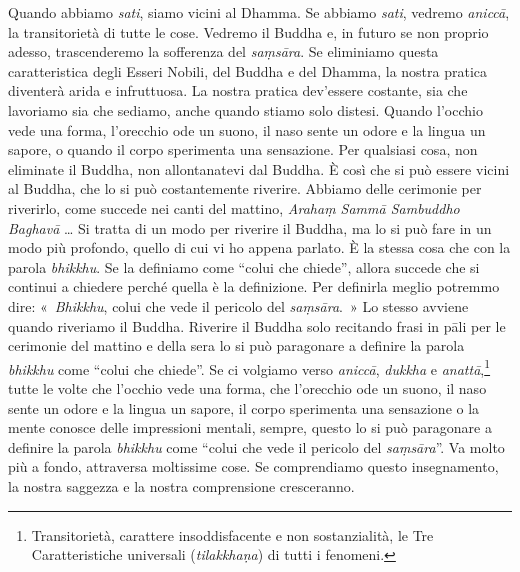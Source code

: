 Quando abbiamo \emph{sati}, siamo vicini al Dhamma. Se abbiamo
\emph{sati}, vedremo \emph{aniccā}, la transitorietà di tutte le cose.
Vedremo il Buddha e, in futuro se non proprio adesso, trascenderemo la
sofferenza del \emph{saṃsāra}. Se eliminiamo questa caratteristica degli
Esseri Nobili, del Buddha e del Dhamma, la nostra pratica diventerà
arida e infruttuosa. La nostra pratica dev'essere costante, sia che
lavoriamo sia che sediamo, anche quando stiamo solo distesi. Quando
l'occhio vede una forma, l'orecchio ode un suono, il naso sente un odore
e la lingua un sapore, o quando il corpo sperimenta una sensazione. Per
qualsiasi cosa, non eliminate il Buddha, non allontanatevi dal Buddha. È
così che si può essere vicini al Buddha, che lo si può costantemente
riverire. Abbiamo delle cerimonie per riverirlo, come succede nei canti
del mattino, \emph{Arahaṃ Sammā Sambuddho Baghavā} \ldots{} Si tratta di un
modo per riverire il Buddha, ma lo si può fare in un modo più profondo,
quello di cui vi ho appena parlato. È la stessa cosa che con la parola
\emph{bhikkhu}. Se la definiamo come ``colui che chiede'', allora
succede che si continui a chiedere perché quella è la definizione. Per
definirla meglio potremmo dire: «~\emph{Bhikkhu}, colui che vede il
pericolo del \emph{saṃsāra}.~» Lo stesso avviene quando riveriamo il
Buddha. Riverire il Buddha solo recitando frasi in pāli per le cerimonie
del mattino e della sera lo si può paragonare a definire la parola
\emph{bhikkhu} come ``colui che chiede''. Se ci volgiamo verso
\emph{aniccā}, \emph{dukkha} e \emph{anattā},\footnote{Transitorietà,
  carattere insoddisfacente e non sostanzialità, le Tre Caratteristiche
  universali (\emph{tilakkhaṇa}) di tutti i fenomeni.} tutte le volte
che l'occhio vede una forma, che l'orecchio ode un suono, il naso sente
un odore e la lingua un sapore, il corpo sperimenta una sensazione o la
mente conosce delle impressioni mentali, sempre, questo lo si può
paragonare a definire la parola \emph{bhikkhu} come ``colui che vede il
pericolo del \emph{saṃsāra}''. Va molto più a fondo, attraversa
moltissime cose. Se comprendiamo questo insegnamento, la nostra saggezza
e la nostra comprensione cresceranno.

